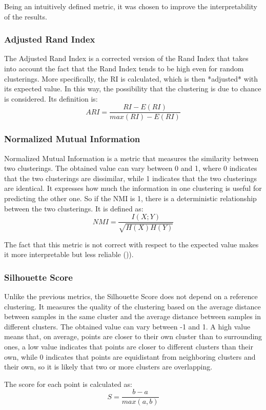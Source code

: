 \documentclass[12pt,a4paper]{article}
\begin{document}
Being an intuitively defined metric, it was chosen to improve the interpretability of the results.

\subsubsection{Adjusted Rand Index}
The Adjusted Rand Index is a corrected version of the Rand Index that takes into account the fact that the Rand Index tends to be high even for random clusterings. More specifically, the RI is calculated, which is then *adjusted* with its expected value. In this way, the possibility that the clustering is due to chance is considered.
Its definition is:
$$ ARI = \frac{RI - E(RI)}{max(RI) - E(RI)} $$

\subsubsection{Normalized Mutual Information}
Normalized Mutual Information is a metric that measures the similarity between two clusterings. The obtained value can vary between 0 and 1, where 0 indicates that the two clusterings are dissimilar, while 1 indicates that the two clusterings are identical. It expresses how much the information in one clustering is useful for predicting the other one. So if the NMI is 1, there is a deterministic relationship between the two clusterings.
It is defined as:
$$ NMI = \frac{I(X;Y)}{\sqrt{H(X)H(Y)}} $$

The fact that this metric is not correct with respect to the expected value makes it more interpretable but less reliable (\citep{amelio2015})).

\subsubsection{Silhouette Score}
Unlike the previous metrics, the Silhouette Score does not depend on a reference clustering. It measures the quality of the clustering based on the average distance between samples in the same cluster and the average distance between samples in different clusters. The obtained value can vary between -1 and 1.
A high value means that, on average, points are closer to their own cluster than to surrounding ones, a low value indicates that points are closer to different clusters than their own, while 0 indicates that points are equidistant from neighboring clusters and their own, so it is likely that two or more clusters are overlapping.

The score for each point is calculated as:
$$ S = \frac{b - a}{max(a, b)} $$
\end{document}

